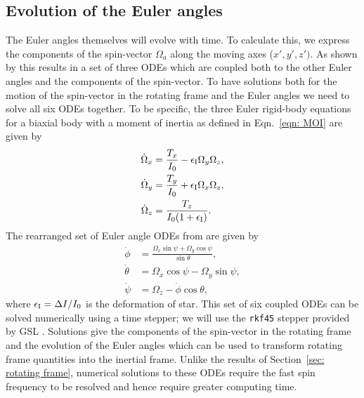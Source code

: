 \documentclass[../full_thesis/full_thesis.tex]{subfiles}
\begin{document}
\subsection{Evolution of the Euler angles}
\label{sec: evolution of the euler angles}
The Euler angles themselves will evolve with time. To calculate this, we
express the components of the spin-vector $\Omega_a$ along the moving axes ($x', y', z')$. As
shown by \citet{Landau1969} this results in a set of three ODEs which are
coupled both to the other Euler angles and the components of the spin-vector.
To have solutions both for the motion of the spin-vector in the rotating frame
and the Euler angles we need to solve all six ODEs together. To be specific,
the three Euler rigid-body equations for a biaxial body with a moment
of inertia as defined in Eqn.~\eqref{eqn: MOI} are given by
\begin{align}
\dot{\Omega}_{x} & = \frac{T_x}{I_{0}} -\epsilon_{\mathrm{I}} \Omega_{y} \Omega_{z},
\label{eqn: 6ODE x}
\\
\dot{\Omega}_{y} & = \frac{T_y}{I_{0}} + \epsilon_{\mathrm{I}} \Omega_{x} \Omega_{z},
\label{eqn: 6ODE y}
\\
\dot{\Omega}_{z} & =\frac{T_z}{I_{0}(1+\epsilon_{\mathrm{I}})}.
\label{eqn: 6ODE z}
\end{align}
The rearranged set of Euler angle ODEs from \citet{Landau1969} are given
by
\begin{align}
\dot{\phi} & = \frac{\Omega_{x} \sin \psi + \Omega_{y} \cos \psi}{\sin \theta},
\label{eqn: 6ODE phi}
\\
\dot{\theta} & = \Omega_{x} \cos \psi - \Omega_{y} \sin \psi,
\label{eqn: 6ODE theta}
\\
\dot{\psi} & = \Omega_{z} - \dot{\phi} \cos \theta,
\label{eqn: 6ODE psi}
\end{align}
where $\epsilon_{\mathrm{I}} = \Delta I/I_0$ is the deformation of star.
This set of six coupled ODEs can be solved numerically using a time stepper; we
will use the \texttt{rkf45} stepper provided by GSL \citep{gough2009gnu}.
Solutions give the components of the spin-vector in the rotating frame and the
evolution of the Euler angles which can be used to transform rotating frame
quantities into the inertial frame. Unlike the results of Section~\ref{sec:
rotating frame}, numerical solutions to these ODEs require the fast spin frequency
to be resolved and hence require greater computing time.

\end{document}
